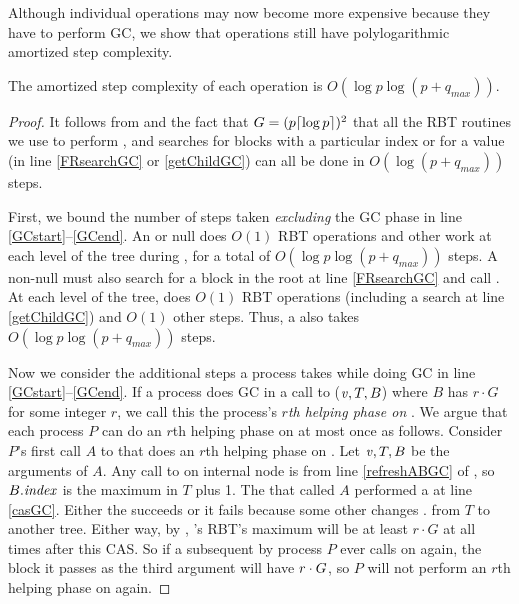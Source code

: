 
Although individual operations may now become more expensive because they have to perform GC,
we show that operations still have polylogarithmic amortized step complexity.

\begin{mytheorem}
The amortized step complexity of each operation is $O(\log p \log(p+q_{max}))$.
\end{mytheorem}
\begin{proof}
It follows from  and the fact that $G=(p\lceil \log p \rceil)^2$
that all the RBT routines we use to perform ,  and searches for
blocks with a particular index or for a  value (in line \ref{FRsearchGC} or \ref{getChildGC}) can all be done in $O(\log(p+q_{max}))$ steps.

First, we bound the number of steps taken \emph{excluding} the GC phase in line \ref{GCstart}--\ref{GCend}.
An  or null  does $O(1)$ RBT operations and other work at each level of the tree during ,
for a total of $O(\log p \log(p+q_{max}))$ steps.
A non-null  must also search for a block in the root at line \ref{FRsearchGC}
and call .  At each level of the tree,  does $O(1)$ RBT operations (including a search at line \ref{getChildGC}) and $O(1)$ other steps.
Thus, a  also takes $O(\log p \log(p+q_{max}))$ steps.

Now we consider the additional steps a process takes while doing GC in line \ref{GCstart}--\ref{GCend}.
If a process does GC in a call to ($\mbox{\textnormal{\textit{v}}},T,B$) where $B$ has  $r\cdot G$ for some integer $r$, we call this the process's \emph{$r$th helping phase on }.
We argue that each process $P$ can do an $r$th helping phase on  at most once as follows.
Consider $P$'s first call $A$ to  that does an $r$th helping phase on .
Let $\mbox{\textnormal{\textit{v}}},T,B$ be the arguments of $A$.
Any call to  on internal node  is from line \ref{refreshABGC} of , so $B.\mbox{\textit{index}}$
is the maximum  in $T$ plus 1.
The  that called $A$ performed a  at line \ref{casGC}.  Either the  succeeds
or it fails because 
some other  changes . from $T$ to another tree.
Either way, by , 's RBT's maximum  will be at least $r\cdot G$ at all times
after this CAS.
So if a subsequent  by process $P$ 
ever calls  on  again, the block it passes as the third argument
will have $\index>r\cdot G$, so $P$ will not perform an $r$th helping phase on  again.


\end{proof}
